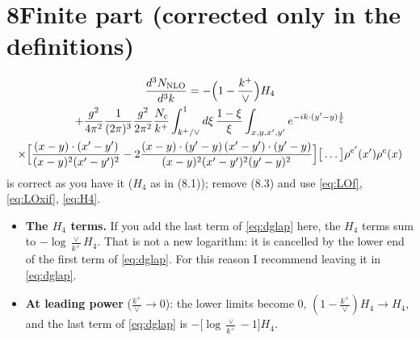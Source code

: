 \documentclass[10pt]{article}
\numberwithin{equation}{section}
\begin{document}
\section*{8\quad Finite part (corrected only in the definitions)}
\begin{multline}
\frac{d^{3}N_{\rm NLO}}{d^{3}k}=-\Big(1-\frac{k^+}{\vee}\Big)H_4\\+\frac{g^{2}}{4\pi^{2}}\frac{1}{(2\pi)^{3}}\frac{g^{2}}{2\pi^{2}}\frac{N_{c}}{k^{+}}\int_{k^+/\vee}^{1}d\xi\,\frac{1-\xi}{\xi}\int_{x,y,x',y'}e^{-ik\cdot(y'-y)\frac{1}{\xi}}\\\times\Big[\frac{(x-y)\cdot(x'-y')}{(x-y)^{2}(x'-y')^{2}}-2\frac{(x-y)\cdot(y'-y)\,(x'-y')\cdot(y'-y)}{(x-y)^{2}(x'-y')^{2}(y'-y)^{2}}\Big]\big[\dots\big]\rho^{e'}(x')\rho^{e}(x)
\end{multline}
is correct as you have it ($H_4$ as in (8.1)); remove (8.3) and use \eqref{eq:LOf}, \eqref{eq:LOxif}, \eqref{eq:H4}.
\begin{itemize}
\item \textbf{The $H_4$ terms.} If you add the last term of \eqref{eq:dglap} here, the $H_4$ terms sum to $-\log\frac{\vee}{k^+}H_4$. That is not a new logarithm: it is cancelled by the lower end of the first term of \eqref{eq:dglap}. For this reason I recommend leaving it in \eqref{eq:dglap}.
\item \textbf{At leading power} ($\frac{k^+}{\vee}\to0$): the lower limits become $0$, $(1-\frac{k^+}{\vee})H_4\to H_4$, and the last term of \eqref{eq:dglap} is $-\big[\log\frac{\vee}{k^+}-1\big]H_4$.
\end{itemize}
\end{document}

